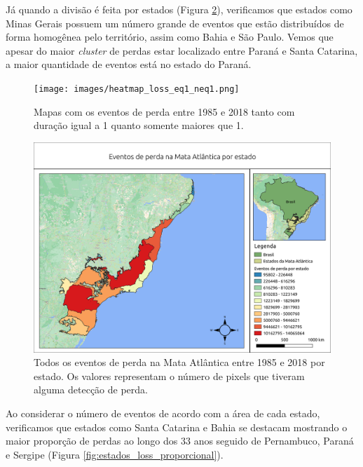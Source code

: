Já quando a divisão é feita por estados (Figura \ref{fig:estados_loss_masked85_maskedgain}), verificamos que estados como Minas Gerais possuem um número grande de eventos que estão distribuídos de forma homogênea pelo território, assim como Bahia e São Paulo. Vemos que apesar do maior \textit{cluster} de perdas estar localizado entre Paraná e Santa Catarina, a maior quantidade de eventos está no estado do Paraná. 

\begin{figure}[H]
    \centering
    \texttt{[image: images/heatmap\_loss\_eq1\_neq1.png]}
    \caption{Mapas com os eventos de perda entre 1985 e 2018 tanto com duração igual a 1 quanto somente maiores que 1.}
    \label{fig:heat_loss_eq1_neq1}
\end{figure}

\begin{figure}[H]
    \centering
    \includegraphics[scale=.5]{images/estados_loss_masked85_maskedGain.png}
    \caption{Todos os eventos de perda na Mata Atlântica entre 1985 e 2018 por estado. Os valores representam o número de pixels que tiveram alguma detecção de perda.}
    \label{fig:estados_loss_masked85_maskedgain}
\end{figure}

Ao considerar o número de eventos de acordo com a área de cada estado, verificamos que estados como Santa Catarina e Bahia se destacam mostrando o maior proporção de perdas ao longo dos 33 anos seguido de Pernambuco, Paraná e Sergipe (Figura \ref{fig:estados_loss_proporcional}).

